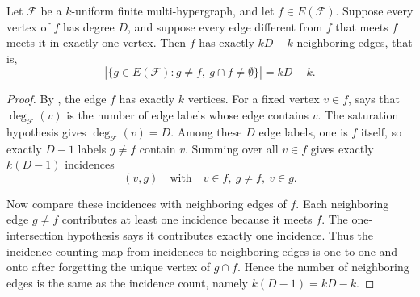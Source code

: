 \begin{helper}
Let $\mathcal F$ be a $k$-uniform finite multi-hypergraph, and let
$f\in E(\mathcal F)$.  Suppose every vertex of $f$ has degree $D$, and
suppose every edge different from $f$ that meets $f$ meets it in exactly one
vertex.  Then $f$ has exactly $kD-k$ neighboring edges, that is,
\[
\left|\{g\in E(\mathcal F):g\ne f,\ g\cap f\ne\emptyset\}\right|=kD-k .
\]
\end{helper}
\begin{proof}
By , the edge $f$ has exactly $k$ vertices.  For a
fixed vertex $v\in f$,  says that
$\deg_{\mathcal F}(v)$ is the number of edge labels whose edge contains $v$.
The saturation hypothesis gives $\deg_{\mathcal F}(v)=D$.  Among these $D$
edge labels, one is $f$ itself, so exactly $D-1$ labels $g\ne f$ contain
$v$.  Summing over all $v\in f$ gives exactly $k(D-1)$ incidences
\[
(v,g)\quad\text{with}\quad v\in f,\ g\ne f,\ v\in g .
\]

Now compare these incidences with neighboring edges of $f$.  Each neighboring
edge $g\ne f$ contributes at least one incidence because it meets $f$.
The one-intersection hypothesis says it contributes exactly one incidence.
Thus the incidence-counting map from incidences to neighboring edges is
one-to-one and onto after forgetting the unique vertex of $g\cap f$.  Hence
the number of neighboring edges is the same as the incidence count, namely
$k(D-1)=kD-k$.
\end{proof}
